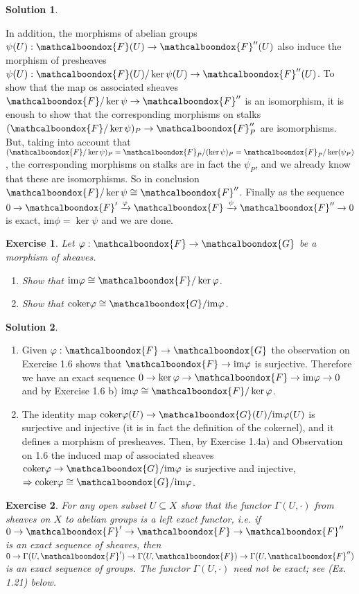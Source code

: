 \documentclass[12pt]{article}
\newcommand{\imp}{\ensuremath{\Rightarrow}}
\newcommand{\ima}{\ensuremath{\mathrm{im}}}
\newtheorem{ex}{Exercise}[section]
\theoremstyle{definition}
\newtheorem*{sol}{Solution}
\newcommand{\sF}{\ensuremath{\mathcalboondox{F}}}
\newcommand{\sG}{\ensuremath{\mathcalboondox{G}}}
\begin{document}
\begin{sol}
\begin{enumerate}[label=\alph*)]
		In addition, the morphisms of abelian groups $\psi(U): \sF(U) \to \sF''(U)$ also induce the morphism of presheaves $\psi(U): \sF(U)/\ker \psi(U) \to \sF''(U)$. To show that the map os associated sheaves $\sF/\ker \psi \to \sF''$ is an isomorphism, it is enoush to show that the corresponding morphisms on stalks $(\sF/\ker \psi)_P \to \sF''_P$ are isomorphisms. But, taking into account that $(\sF/\ker \psi)_P = \sF_P / (\ker \psi)_P = \sF_P / \ker(\psi_P)$, the corresponding morphisms on stalks are in fact the $\overline{\psi_P}$, and we already know that these are isomorphisms. So in conclusion $\sF/\ker \psi \cong \sF''$. Finally as the sequence $0 \xrightarrow[]{} \sF' \xrightarrow[]{\varphi} \sF \xrightarrow[]{\psi} \sF'' \xrightarrow[]{} 0$ is exact, $\ima \phi = \ker \psi$ and we are done.
	\end{enumerate}
\end{sol}

\begin{ex}
	Let $\varphi: \sF \to \sG$ be a morphism of sheaves.
	\begin{enumerate}[label=\alph*)]
		\item Show that $\ima \varphi \cong \sF/\ker \varphi$.
		\item Show that $\mathrm{coker} \varphi \cong \sG /\ima \varphi$.
	\end{enumerate}
\end{ex}

\begin{sol}
	\begin{enumerate}[label=\alph*)]
		\item Given $\varphi: \sF \to \sG$ the observation on Exercise 1.6 shows that $\sF \to \ima \varphi$ is surjective. Therefore we have an exact sequence $0 \to \ker \varphi \to \sF \to \ima \varphi \to 0$ and by Exercise 1.6 b) $\ima \varphi \cong \sF / \ker \varphi$.

		\item The identity map $\mathrm{coker} \varphi (U) \to \sG(U)/ \ima \varphi(U)$ is surjective and injective (it is in fact the definition of the cokernel), and it defines a morphism of presheaves. Then, by Exercise 1.4a) and Observation on 1.6 the induced map of associated sheaves $\text{coker} \varphi \to \sG/ \ima \varphi$ is surjective and injective, $\imp \text{coker} \varphi \cong \sG/ \ima \varphi$.
	\end{enumerate}
\end{sol}

\begin{ex}
	For any open subset $U \subseteq X$ show that the functor $\Gamma(U,·)$ from sheaves on $X$ to abelian groups is a left exact functor, i.e. if $0 \to \sF' \to \sF \to \sF''$ is an exact sequence of sheaves, then $0 \to \Gamma(U,\sF') \to \Gamma(U, \sF) \to \Gamma(U, \sF'')$ is an exact sequence of groups. The functor $\Gamma(U,\cdot)$ need not be exact; see (Ex. 1.21) below.
\end{ex}
\end{document}
